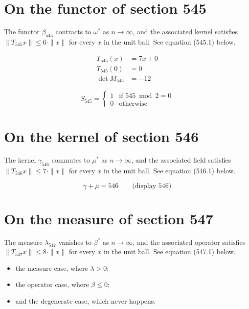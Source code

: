 \documentclass{article}
\begin{document}
\section{On the functor of section 545}
The functor $\beta_{545}$ contracts to $\omega^{*}$ as $n \to \infty$,
and the associated kernel satisfies $\|T_{545} x\| \leq 6 \cdot \|x\|$
for every $x$ in the unit ball. See equation (545.1) below.

\begin{align}
T_{545}(x) &= 7 x + 0 \\
T_{545}(0) &= 0 \\
\det M_{545} &= -12
\end{align}

\begin{equation}
S_{545} = \begin{cases} 1 & \text{if } 545 \bmod 2 = 0 \\ 0 & \text{otherwise} \end{cases}
\end{equation}

\section{On the kernel of section 546}
The kernel $\gamma_{546}$ commutes to $\mu^{*}$ as $n \to \infty$,
and the associated field satisfies $\|T_{546} x\| \leq 7 \cdot \|x\|$
for every $x$ in the unit ball. See equation (546.1) below.

$$
\gamma + \mu = 546 \qquad \text{(display 546)}
$$

\section{On the measure of section 547}
The measure $\lambda_{547}$ vanishes to $\beta^{*}$ as $n \to \infty$,
and the associated operator satisfies $\|T_{547} x\| \leq 8 \cdot \|x\|$
for every $x$ in the unit ball. See equation (547.1) below.

\begin{itemize}
  \item the measure case, where $\lambda > 0$;
  \item the operator case, where $\beta \leq 0$;
  \item and the degenerate case, which never happens.
\end{itemize}
\end{document}

